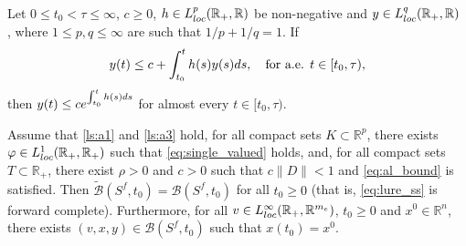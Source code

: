 \documentclass[10pt,a4paper]{amsart}
\newcommand{\R}{\mathbb R}
\newcommand{\sB}{{\mathcal B}}
\begin{document}
\begin{lemma}\label{lem_a:gronwall}
Let $0\leq t_0<\tau\leq\infty$, $c\geq 0$, $h\in L^p_{\rm loc}(\R_+,\R)$ be non-negative and
$y\in L^q_{\rm loc}(\R_+,\R)$ , where $1\leq p,q\leq\infty$ are such that $1/p+1/q=1$. If
\[
y(t)\leq c+\int_{t_0}^t h(s)y(s){\rm d}s,\quad\mbox{for a.e. $t\in[t_0,\tau)$},
\]
then $y(t)\leq ce^{\int_{t_0}^t h(s){\rm d}s}$ for almost every $t\in[t_0,\tau)$.
\end{lemma}

\begin{corollary}\label{cor:inclusion_wp}
Assume that \ref{ls:a1} and \ref{ls:a3} hold, for all compact sets $K\subset\R^p$, there exists $\varphi\in L^1_{\rm loc}(\R_+,\R_+)$ such that \eqref{eq:single_valued} holds, and,
for all compact sets $T\subset\R_+$, there exist $\rho>0$ and $c>0$ such that $c\|D\|<1$ and
\eqref{eq:al_bound} is satisfied. Then $\tilde\sB(S^f,t_0)=\sB(S^f,t_0)$ for all $t_0\geq 0$ {\rm (}that is, \eqref{eq:lure_ss} is forward complete{\rm )}. Furthermore, for all $v\in L^\infty_{\rm loc}(\R_+,\R^{m_{\rm e}})$, $t_0\geq 0$ and $x^0\in\R^n$, there exists $(v,x,y)\in \sB(S^f,t_0)$ such that $x(t_0)=x^0$.
\end{corollary}
\end{document}
